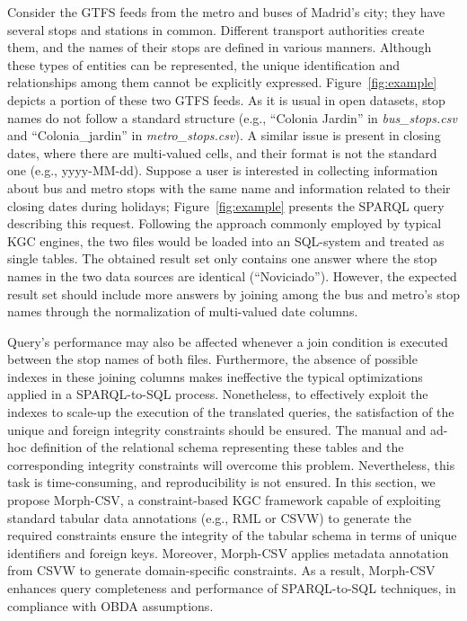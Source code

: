 Consider the GTFS feeds from the metro and buses of Madrid's city; they have several stops and stations in common. Different transport authorities create them, and the names of their stops are defined in various manners. Although these types of entities can be represented, the unique identification and relationships among them cannot be explicitly expressed. Figure~\ref{fig:example} depicts a portion of these two GTFS feeds. As it is usual in open datasets, stop names do not follow a standard structure (e.g., ``Colonia Jardin'' in \textit{bus\_stops.csv} and ``Colonia\_jardin'' in \textit{metro\_stops.csv}). A similar issue is present in closing dates, where there are multi-valued cells, and their format is not the standard one (e.g., yyyy-MM-dd). Suppose a user is interested in collecting information about bus and metro stops with the same name and information related to their closing dates during holidays; Figure~\ref{fig:example} presents the SPARQL query describing this request. Following the approach commonly employed by typical KGC engines, the two files would be loaded into an SQL-system and treated as single tables. The obtained result set only contains one answer where the stop names in the two data sources are identical (``Noviciado''). However, the expected result set should include more answers by joining among the bus and metro's stop names through the normalization of multi-valued date columns. 

Query's performance may also be affected whenever a join condition is executed between the stop names of both files. Furthermore, the absence of possible indexes in these joining columns makes ineffective the typical optimizations applied in a SPARQL-to-SQL process. Nonetheless, to effectively exploit the indexes to scale-up the execution of the translated queries, the satisfaction of the unique and foreign integrity constraints should be ensured. The manual and ad-hoc definition of the relational schema representing these tables and the corresponding integrity constraints will overcome this problem. Nevertheless, this task is time-consuming, and reproducibility is not ensured. In this section, we propose Morph-CSV, a constraint-based KGC framework capable of exploiting standard tabular data annotations (e.g., RML or CSVW) to generate the required constraints ensure the integrity of the tabular schema in terms of unique identifiers and foreign keys. Moreover, Morph-CSV applies metadata annotation from CSVW to generate domain-specific constraints. As a result, Morph-CSV enhances query completeness and performance of SPARQL-to-SQL techniques, in compliance with OBDA assumptions.


